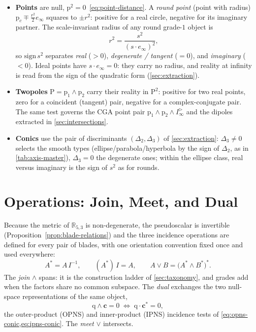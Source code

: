 \documentclass{birkjour}
\theoremstyle{definition}
\theoremstyle{remark}
\newcommand{\einf}{e_\infty}
\newcommand{\Iinfd}{I_\infty^{\triangleright}}%
\newcommand{\meet}{\vee}
\newcommand{\joinp}{\wedge}
\begin{document}
\begin{itemize}
\item \textbf{Points} are null, $\mathrm{p}^2=0$~\eqref{eq:point-distance}.
  A \emph{round point} (point with radius) $\mathrm{p}_c\mp\tfrac{r^2}{2}\einf$
  squares to $\pm r^2$: positive for a real circle, negative for its imaginary
  partner. The scale-invariant radius of any round grade-$1$ object is
  \begin{equation}\label{eq:invariant-radius}
    r^2 = \frac{s^2}{(s\cdot\einf)^2},
  \end{equation}
  so $\mathrm{sign}\,s^2$ separates \emph{real} ($>0$), \emph{degenerate /
  tangent} ($=0$), and \emph{imaginary} ($<0$). Ideal points have
  $s\cdot\einf=0$: they carry no radius, and reality at infinity is read from
  the sign of the quadratic form (\cref{sec:extraction}).
\item \textbf{Twopoles} $\mathrm{P}=\mathrm{p}_1\joinp\mathrm{p}_2$ carry their
  reality in $\mathrm{P}^2$: positive for two real points, zero for a
  coincident (tangent) pair, negative for a complex-conjugate pair. The same
  test governs the CGA point pair $\mathrm{p}_1\joinp\mathrm{p}_2\joinp\Iinfd$
  and the dipoles extracted in \cref{sec:intersections}.
\item \textbf{Conics} use the pair of discriminants
  $(\Delta_2,\Delta_3)$ of \cref{sec:extraction}: $\Delta_3\neq0$ selects the
  smooth types (ellipse/parabola/hyperbola by the sign of $\Delta_2$, as in
  \cref{tab:axis-master}), $\Delta_3=0$ the degenerate ones; within the
  ellipse class, real versus imaginary is the sign of $s^2$ as for rounds.
\end{itemize}

\section{Operations: Join, Meet, and Dual}
\label{sec:operations}
Because the metric of $\mathbb{R}_{5,3}$ is non-degenerate, the pseudoscalar is
invertible (Proposition~\ref{prop:blade-relations}) and the three incidence operations
are defined for every pair of blades, with one orientation convention fixed
once and used everywhere:
\begin{equation}\label{eq:operations}
  A^{*} = A\,I^{-1}, \qquad
  (A^{*})\,I = A, \qquad
  A \meet B = \big(A^{*}\joinp B^{*}\big)^{*}.
\end{equation}
The \emph{join} $\joinp$ spans: it is the construction ladder of
\cref{sec:taxonomy}, and grades add when the factors share no common subspace.
The \emph{dual} exchanges the two null-space representations of the same
object,
\begin{equation}\label{eq:incidence}
  \mathrm{q}\joinp \mathbf{c} = 0
  \;\iff\;
  \mathrm{q}\cdot \mathbf{c}^{*} = 0 ,
\end{equation}
the outer-product (OPNS) and inner-product (IPNS) incidence tests of
\cref{eq:opns-conic,eq:ipns-conic}. The \emph{meet} $\meet$ intersects.
\end{document}
